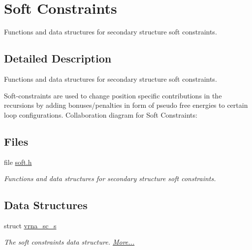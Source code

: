 \hypertarget{group__soft__constraints}{}\section{Soft Constraints}
\label{group__soft__constraints}


Functions and data structures for secondary structure soft constraints.  




\subsection{Detailed Description}
Functions and data structures for secondary structure soft constraints. 

Soft-\/constraints are used to change position specific contributions in the recursions by adding bonuses/penalties in form of pseudo free energies to certain loop configurations. Collaboration diagram for Soft Constraints\+:
\subsection*{Files}
\begin{DoxyCompactItemize}
\item 
file \mbox{\hyperlink{soft_8h}{soft.\+h}}
\begin{DoxyCompactList}\small\item\em Functions and data structures for secondary structure soft constraints. \end{DoxyCompactList}\end{DoxyCompactItemize}
\subsection*{Data Structures}
\begin{DoxyCompactItemize}
\item 
struct \mbox{\hyperlink{group__soft__constraints_structvrna__sc__s}{vrna\+\_\+sc\+\_\+s}}
\begin{DoxyCompactList}\small\item\em The soft constraints data structure.  \mbox{\hyperlink{group__soft__constraints_structvrna__sc__s}{More...}}\end{DoxyCompactList}\end{DoxyCompactItemize}
